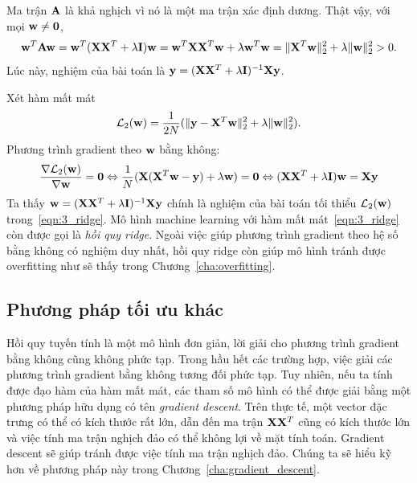 Ma trận $\mathbf{A}$ là khả nghịch vì nó là một ma trận xác định dương. Thật vậy, với
mọi $\mathbf{w} \neq \mathbf{0}$,
\begin{equation*}
\mathbf{w}^T\mathbf{A}\mathbf{w} = \mathbf{w}^T(\mathbf{X}\mathbf{X}^T + \lambda \mathbf{I}) \mathbf{w} = \mathbf{w}^T\mathbf{X}\mathbf{X}^T\mathbf{w}  +
\lambda \mathbf{w}^T\mathbf{w} = \|\mathbf{X}^T\mathbf{w}\|_2^2 + \lambda \|\mathbf{w}\|_2^2 > 0.
\end{equation*}
Lúc này, nghiệm của bài toán là $\mathbf{y} = (\mathbf{X} \mathbf{X}^T + \lambda \mathbf{I})^{-1} \mathbf{X}\mathbf{y}$.

Xét hàm mất mát
\begin{equation}
\label{eqn:3_ridge}
\mathcal{L}_2(\mathbf{w}) = \frac{1}{2N}(\|\mathbf{y} - \mathbf{X}^T\mathbf{w}\|_2^2 + \lambda\|\mathbf{w}\|_2^2).
\end{equation}
Phương trình gradient theo $\mathbf{w}$ bằng không:
\begin{equation}
\frac{\nabla \mathcal{L}_2(\mathbf{w})}{\nabla \mathbf{w}} = \mathbf{0} \Leftrightarrow
\frac{1}{N}(\mathbf{X}(\mathbf{X}^T\mathbf{w} - \mathbf{y}) + \lambda \mathbf{w}) = \mathbf{0} \Leftrightarrow
(\mathbf{X}\mathbf{X}^T + \lambda \mathbf{I}) \mathbf{w} = \mathbf{X}\mathbf{y}
\end{equation}
Ta thấy $\mathbf{w} = (\mathbf{X}\mathbf{X}^T + \lambda\mathbf{I})^{-1}\mathbf{X}\mathbf{y}$ chính là nghiệm của
bài toán tối thiểu $\mathcal{L}_2(\mathbf{w})$ trong~\eqref{eqn:3_ridge}. Mô hình machine learning với hàm mất mát~\eqref{eqn:3_ridge} còn được
gọi là \textit{hồi quy ridge}.
Ngoài việc giúp phương trình gradient theo hệ số bằng không có nghiệm duy
nhất, hồi quy ridge còn giúp mô hình tránh được overfitting như sẽ thấy trong Chương~\ref{cha:overfitting}.

\subsection{Phương pháp tối ưu khác}


Hồi quy tuyến tính là một mô hình đơn giản, lời giải cho phương trình gradient
bằng không cũng không phức tạp. {Trong hầu hết các trường hợp, việc giải các
phương trình gradient bằng không tương đối phức tạp.} Tuy nhiên, nếu ta tính được đạo hàm của hàm mất mát, các tham số mô hình có thể được giải bằng một phương pháp hữu dụng có tên \textit{gradient descent}. Trên thực tế, một vector đặc trưng có thể
có kích thước rất lớn, dẫn đến ma trận $\mathbf{X}\mathbf{X}^T$ cũng có kích thước lớn và việc
tính ma trận nghịch đảo có thể không lợi về mặt tính toán. Gradient descent sẽ
giúp tránh được việc tính ma trận nghịch đảo. Chúng ta sẽ hiểu kỹ hơn về phương
pháp này trong Chương~\ref{cha:gradient_descent}.



